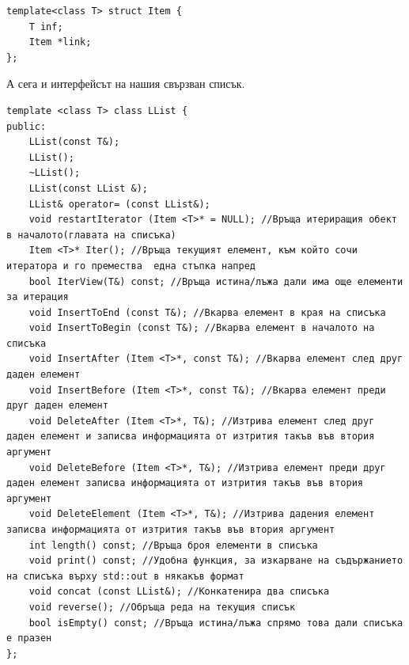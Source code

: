 \documentclass[11pt]{article} %
\begin{document}
\begin{verbatim}
template<class T> struct Item {
	T inf;
	Item *link;
};
\end{verbatim} 

А сега и интерфейсът на нашия свързван списък.
\begin{verbatim}
template <class T> class LList {
public:
	LList(const T&);
	LList();
	~LList();
	LList(const LList &);
	LList& operator= (const LList&);
	void restartIterator (Item <T>* = NULL); //Връща итериращия обект в началото(главата на списъка)
	Item <T>* Iter(); //Връща текущият елемент, към който сочи итератора и го премества  една стъпка напред  
	bool IterView(T&) const; //Връща истина/лъжа дали има още елементи за итерация
	void InsertToEnd (const T&); //Вкарва елемент в края на списъка
	void InsertToBegin (const T&); //Вкарва елемент в началото на списъка
	void InsertAfter (Item <T>*, const T&); //Вкарва елемент след друг даден елемент
	void InsertBefore (Item <T>*, const T&); //Вкарва елемент преди друг даден елемент
	void DeleteAfter (Item <T>*, T&); //Изтрива елемент след друг даден елемент и записва информацията от изтрития такъв във втория аргумент
	void DeleteBefore (Item <T>*, T&); //Изтрива елемент преди друг даден елемент записва информацията от изтрития такъв във втория аргумент
	void DeleteElement (Item <T>*, T&); //Изтрива дадения елемент записва информацията от изтрития такъв във втория аргумент
	int length() const; //Връща броя елементи в списъка
	void print() const; //Удобна функция, за изкарване на съдържанието на списъка върху std::out в някакъв формат
	void concat (const LList&); //Конкатенира два списъка
	void reverse(); //Обръща реда на текущия списък
	bool isEmpty() const; //Връща истина/лъжа спрямо това дали списъка е празен
};
\end{verbatim}
\end{document}

